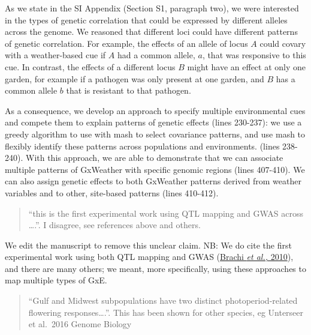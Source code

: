 \documentclass[
  letterpaper,
  DIV=11,
  numbers=noendperiod]{scrartcl}
\begin{document}
As we state in the SI Appendix (Section S1, paragraph two), we were
interested in the types of genetic correlation that could be expressed
by different alleles across the genome. We reasoned that different loci
could have different patterns of genetic correlation. For example, the
effects of an allele of locus \(A\) could covary with a weather-based
cue if \(A\) had a common allele, \(a\), that was responsive to this
cue. In contrast, the effects of a different locus \(B\) might have an
effect at only one garden, for example if a pathogen was only present at
one garden, and \(B\) has a common allele \(b\) that is resistant to
that pathogen.

As a consequence, we develop an approach to specify multiple
environmental cues and compete them to explain patterns of genetic
effects (lines 230-237): we use a greedy algorithm to use with mash to
select covariance patterns, and use mash to flexibly identify these
patterns across populations and environments. (lines 238-240). With this
approach, we are able to demonstrate that we can associate multiple
patterns of GxWeather with specific genomic regions (lines 407-410). We
can also assign genetic effects to both GxWeather patterns derived from
weather variables and to other, site-based patterns (lines 410-412).

\begin{quote}
\begin{tcolorbox}[enhanced jigsaw, colframe=quarto-callout-warning-color-frame, rightrule=.15mm, leftrule=.75mm, left=2mm, breakable, toprule=.15mm, arc=.35mm, bottomrule=.15mm, opacityback=0, colback=white]

``this is the first experimental work using QTL mapping and GWAS across
\ldots.''. I disagree, see references above and others.

\end{tcolorbox}
\end{quote}

We edit the manuscript to remove this unclear claim. NB: We do cite the
first experimental work using both QTL mapping and GWAS
(\href{https://doi.org/10.1371/journal.pgen.1000940}{Brachi \emph{et
al.,} 2010}), and there are many others; we meant, more specifically,
using these approaches to map multiple types of GxE.

\begin{quote}
\begin{tcolorbox}[enhanced jigsaw, colframe=quarto-callout-warning-color-frame, rightrule=.15mm, leftrule=.75mm, left=2mm, breakable, toprule=.15mm, arc=.35mm, bottomrule=.15mm, opacityback=0, colback=white]

``Gulf and Midwest subpopulations have two distinct photoperiod-related
flowering responses\ldots.''. This has been shown for other species, eg
Unterseer et al.~2016 Genome Biology

\end{tcolorbox}
\end{quote}
\end{document}
